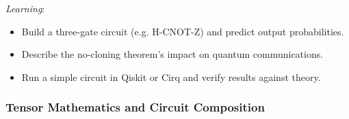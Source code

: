 \emph{Learning}:
\begin{itemize}
	\item Build a three-gate circuit (e.g. H-CNOT-Z) and predict output probabilities.
	\item Describe the no-cloning theorem's impact on quantum communications.
	\item Run a simple circuit in Qiskit or Cirq and verify results against theory.
\end{itemize}





\subsubsection{Tensor Mathematics and Circuit Composition}

